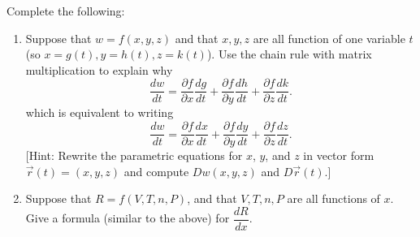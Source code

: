 


\begin{problem}%
Complete the following:
\begin{enumerate}
\item Suppose that $w=f(x,y,z)$ and that $x,y,z$ are all function of one variable $t$ (so $x=g(t), y=h(t), z=k(t)$).  
 Use the chain rule with matrix multiplication to explain why 
$$\frac{dw}{dt} 
= \frac{\partial f}{\partial x}\frac{dg}{dt}+\frac{\partial f}{\partial y}\frac{dh}{dt}+\frac{\partial f}{\partial z}\frac{dk}{dt} 
.$$
which is equivalent to writing $$\frac{dw}{dt} 
= \frac{\partial f}{\partial x}\frac{dx}{dt}+\frac{\partial f}{\partial y}\frac{dy}{dt}+\frac{\partial f}{\partial z}\frac{dz}{dt} 
.$$ [Hint: Rewrite the parametric equations for $x$, $y$, and $z$ in vector form $\vec r(t) = (x,y,z)$ and compute $Dw(x,y,z)$ and $D\vec r(t)$.]
\item Suppose that $R=f(V,T,n,P)$, and that $V,T,n,P$ are all functions of $x$.  Give a formula (similar to the above) for $\dfrac{dR}{dx}.$  

\end{enumerate}
\end{problem}


